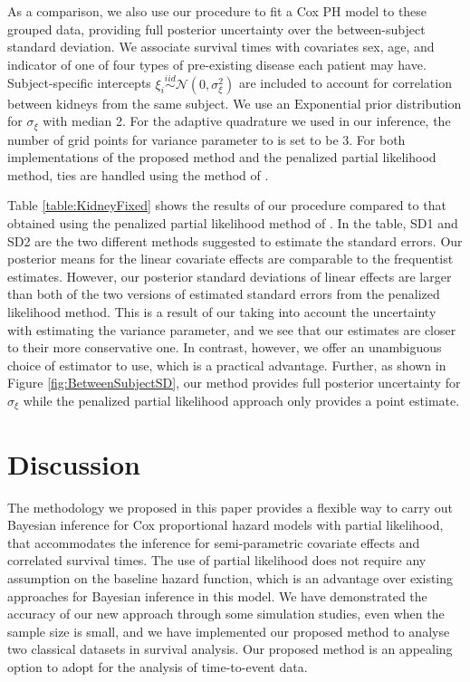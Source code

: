 \documentclass[ba]{imsart}
\begin{document}
As a comparison, we also use our procedure to fit a Cox PH model to these grouped data, providing full posterior uncertainty over the between-subject standard deviation. We associate survival times with covariates sex, age, and indicator of one of four types of pre-existing disease each patient may have. Subject-specific intercepts $\xi_{i}\overset{iid}{\sim}\mathcal{N}(0,\sigma^{2}_{\xi})$ are included to account for correlation between kidneys from the same subject. We use an $\text{Exponential}$ prior distribution for $\sigma_{\xi}$ with median 2. For the adaptive quadrature we used in our inference, the number of grid points for variance parameter to is set to be 3. For both implementations of the proposed method and the penalized partial likelihood method, ties are handled using the method of \cite{Breslow}.

Table \ref{table:KidneyFixed} shows the results of our procedure compared to that obtained using the penalized partial likelihood method of \cite{freqPL}. In the table, SD1 and SD2 are the two different methods \cite{freqepsPL} suggested to estimate the standard errors. Our posterior means for the linear covariate effects are comparable to the frequentist estimates. However, our posterior standard deviations of linear effects are larger than both of the two versions of estimated standard errors from the penalized likelihood method. This is a result of our taking into account the uncertainty with estimating the variance parameter, and we see that our estimates are closer to their more conservative one. In contrast, however, we offer an unambiguous choice of estimator to use, which is a practical advantage. Further, as shown in Figure \ref{fig:BetweenSubjectSD}, our method provides full posterior uncertainty for $\sigma_{\xi}$ while the penalized partial likelihood approach only provides a point estimate.

\section{Discussion}\label{sec:discussion}

The methodology we proposed in this paper provides a flexible way to carry out Bayesian inference for Cox proportional hazard models with partial likelihood, that accommodates the inference for semi-parametric covariate effects and correlated survival times. The use of partial likelihood does not require any assumption on the baseline hazard function, which is an advantage over existing approaches for Bayesian inference in this model. We have demonstrated the accuracy of our new approach through some simulation studies, even when the sample size is small, and we have implemented our proposed method to analyse two classical datasets in survival analysis. Our proposed method is an appealing option to adopt for the analysis of time-to-event data.
\end{document}
